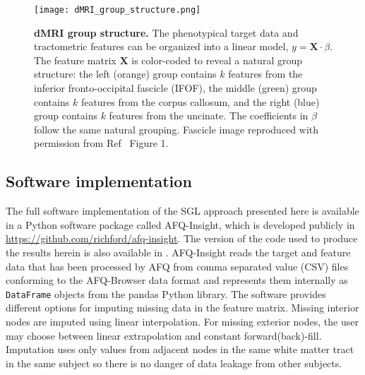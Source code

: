 \begin{figure}[!h]
    \centering
    \texttt{[image: dMRI\_group\_structure.png]}
    \caption{{\bf dMRI group structure.}
        The phenotypical target data and tractometric features can be organized
    into a linear model, $y = \mathbf{X} \cdot \beta$. The feature matrix
    $\mathbf{X}$ is color-coded to reveal a natural group structure: the left
    (orange) group contains $k$ features from the inferior fronto-occipital
    fascicle (IFOF), the middle (green) group contains $k$ features from the
    corpus callosum, and the right (blue) group contains $k$ features from the
    uncinate. The coefficients in $\beta$ follow the same natural grouping.
    Fascicle image reproduced with permission from Ref~\cite{yeatman2012tract}
    Figure 1.}
    \label{fig:group-structure}
\end{figure}

\subsection*{Software implementation}

The full software implementation of the SGL approach presented here is available
in a Python software package called AFQ-Insight, which is developed publicly in
\url{https://github.com/richford/afq-insight}. The version of the code used to
produce the results herein is also available in .
AFQ-Insight reads the target and feature data that has been processed by AFQ
from comma separated value (CSV) files conforming to the AFQ-Browser data
format\cite{yeatman2018browser} and represents them internally as
\lstinline{DataFrame} objects from the pandas Python
library\cite{mckinney2010data}. The software provides different options for
imputing missing data in the feature matrix. Missing interior nodes are imputed
using linear interpolation. For missing exterior nodes, the user may choose
between linear extrapolation and constant forward(back)-fill. Imputation uses
only values from adjacent nodes in the same white matter tract in the same
subject so there is no danger of data leakage from other subjects.